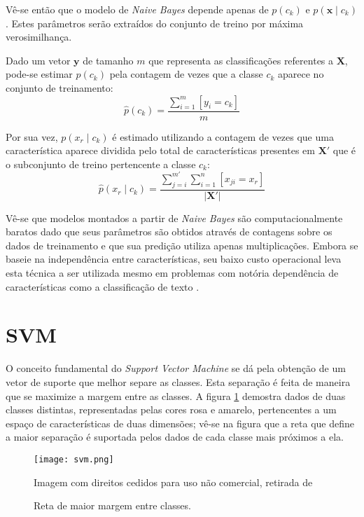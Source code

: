 Vê-se então que o modelo de \textit{Naive Bayes} depende apenas de $p(c_k)$ e $p(\mathbf{x} \mid c_k)$. Estes parâmetros serão extraídos do conjunto de treino por máxima verosimilhança.

Dado um vetor $\mathbf{y}$ de tamanho $m$ que representa as classificações referentes a $\mathbf{X}$, pode-se estimar $p(c_k)$ pela contagem de vezes que a classe $c_k$ aparece no conjunto de treinamento:
\begin{equation}
    \hat{p}(c_k) = \frac{\sum_{i=1}^m [y_i = c_k]}{m}
\end{equation}

Por sua vez, $p(x_r \mid c_k)$ é estimado utilizando a contagem de vezes que uma característica aparece dividida pelo total de características presentes em $\mathbf{X'}$ que é o subconjunto de treino pertencente a classe $c_k$:
\begin{equation}
    \hat{p}(x_r \mid c_k) = \frac{\sum_{j=i}^{m'} \sum_{i=1}^n [x_{ji} = x_r]}{|\mathbf{X'}|}
\end{equation}

Vê-se que modelos montados a partir de \textit{Naive Bayes} são computacionalmente baratos dado que seus parâmetros são obtidos através de contagens sobre os dados de treinamento e que sua predição utiliza apenas multiplicações.
Embora se baseie na independência entre características, seu baixo custo operacional leva esta técnica a ser utilizada mesmo em problemas com notória dependência de características como a classificação de texto \cite{mccallum98}.

\section{SVM}

O conceito fundamental do \textit{Support Vector Machine} se dá pela obtenção de um vetor de suporte que melhor separe as classes. Esta separação é feita de maneira que se maximize a margem entre as classes. A figura \ref{fig:svm} demostra dados de duas classes distintas, representadas pelas cores rosa e amarelo, pertencentes a um espaço de características de duas dimensões; vê-se na figura que a reta que define a maior separação é suportada pelos dados de cada classe mais próximos a ela.

\begin{figure}
\begin{center} {
    \begin{center}
    \texttt{[image: svm.png]}
    \caption{Reta de maior margem entre classes.}
    \small Imagem com direitos cedidos para uso não comercial, retirada de \cite{vanderplas15}
    \label{fig:svm}
    \end{center}
}
\end{center}
\end{figure}

